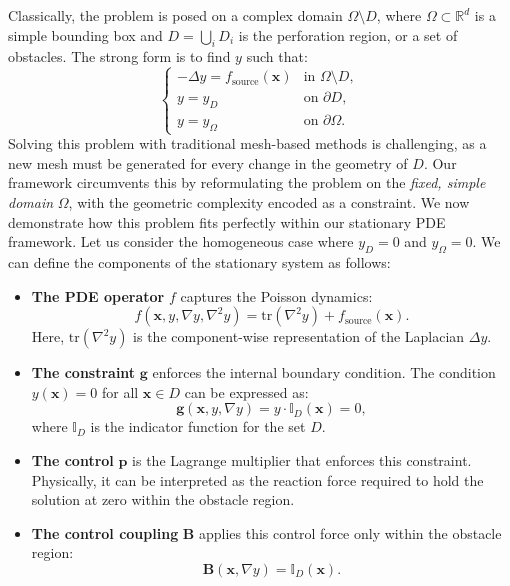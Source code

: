 \documentclass[pdflatex,sn-mathphys-num]{sn-jnl}%
\theoremstyle{thmstyleone}%
\numberwithin{equation}{section}
\newcommand{\indicator}[1]{\mathbb{I}_{#1}}
\begin{document}
Classically, the problem is posed on a complex domain $\Omega \setminus D$, where $\Omega \subset \mathbb{R}^d$ is a simple bounding box and $D = \bigcup_i D_i$ is the perforation region, or a set of obstacles. The strong form is to find $y$ such that:
\begin{equation}
\label{eq:perforated_strong_form}
\begin{cases}
-\Delta y = f_{\text{source}}(\bm{x}) & \text{in } \Omega \setminus D, \\
y = y_D & \text{on } \partial D, \\
y = y_\Omega & \text{on } \partial \Omega.
\end{cases}
\end{equation}
Solving this problem with traditional mesh-based methods is challenging, as a new mesh must be generated for every change in the geometry of $D$. Our framework circumvents this by reformulating the problem on the \textit{fixed, simple domain} $\Omega$, with the geometric complexity encoded as a constraint. We now demonstrate how this problem fits perfectly within our stationary PDE framework. Let us consider the homogeneous case where $y_D = 0$ and $y_\Omega = 0$. We can define the components of the stationary system as follows:
\begin{itemize}
    \item \textbf{The PDE operator} $f$ captures the Poisson dynamics: 
    $$ f(\bm{x}, y, \nabla y, \nabla^2 y) = \text{tr}(\nabla^2 y) + f_{\text{source}}(\bm{x}). $$
    Here, $\text{tr}(\nabla^2 y)$ is the component-wise representation of the Laplacian $\Delta y$.

    \item \textbf{The constraint} $\bm{g}$ enforces the internal boundary condition. The condition $y(\bm{x}) = 0$ for all $\bm{x} \in D$ can be expressed as:
    $$ \bm{g}(\bm{x}, y, \nabla y) = y \cdot \indicator{D}(\bm{x}) = 0, $$
    where $\indicator{D}$ is the indicator function for the set $D$.

    \item \textbf{The control} $\bm{p}$ is the Lagrange multiplier that enforces this constraint. Physically, it can be interpreted as the reaction force required to hold the solution at zero within the obstacle region.

    \item \textbf{The control coupling} $\bm{B}$ applies this control force only within the obstacle region:
    $$ \bm{B}(\bm{x}, \nabla y) = \indicator{D}(\bm{x}). $$
\end{itemize}
\end{document}
